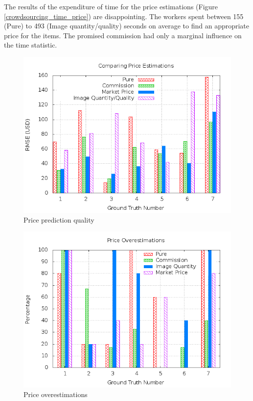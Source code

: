 The results of the expenditure of time for the price estimations (Figure \ref{crowdsourcing_time_price}) are disappointing. The workers spent between 155 (Pure) to 493 (Image quantity/quality) seconds on average to find an appropriate price for the items. The promised commission had only a marginal influence on the time statistic.
\begin{figure}
\centering
\includegraphics[scale=0.55]{images/plots/crowdsourcing/plot_price_rmse.png}
\caption{Price prediction quality}
\label{crowdsourcing_price_pred}
\end{figure}
\begin{figure}
\centering
\includegraphics[scale=0.55]{images/plots/crowdsourcing/plot_price_overestimation.png}
\caption{Price overestimations}
\label{crowdsourcing_price_overestimations}
\end{figure}
